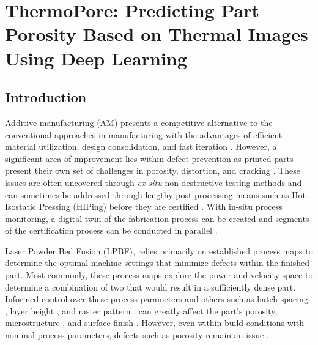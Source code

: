 \newcommand{\bftab}{\fontseries{bs}\selectfont}

\chapter{ThermoPore: Predicting Part Porosity Based on Thermal Images Using Deep Learning}
\label{chapter:thermopore}

\section{Introduction}
Additive manufacturing (AM) presents a competitive alternative to the
conventional approaches in manufacturing with the advantages of efficient
material utilization, design consolidation, and fast iteration \cite{
rahman_review_2023, beaman_additive_2020, akbari_meltpoolnet_2022,
hemmasian_surrogate_2023}. However, a significant area of improvement lies
within defect prevention as printed parts present their own set of challenges in
porosity, distortion, and cracking \cite{rahman_review_2023}. These issues are
often uncovered through \textit{ex-situ} non-destructive testing methods and can
sometimes be addressed through lengthy post-processing means such as Hot
Isostatic Pressing (HIPing) before they are certified
\cite{ordas_fabrication_2015, dolimont_effect_2016}. With in-situ process
monitoring, a digital twin of the fabrication process can be created and
segments of the certification process can be conducted in parallel
\cite{knapp_building_2017, bartsch_digital_2021, gaikwad_toward_2020}.

Laser Powder Bed Fusion (LPBF), relies primarily on established process maps
\cite{clymer_powervelocity_2017, agrawal_predictive_2022, grasso_-situ_2021} to
determine the optimal machine settings that minimize defects within the finished
part. Most commonly, these process maps explore the power and velocity space to
determine a combination of two that would result in a sufficiently dense part.
Informed control over these process parameters and others such as hatch spacing
\cite{xia_influence_2016}, layer height \cite{snyder_build_2015}, and raster
pattern \cite{mertens_optimization_2014}, can greatly affect the part's
porosity, microstructure \cite{gockel_understanding_2013}, and surface finish
\cite{snyder_build_2015}. However, even within build conditions with nominal
process parameters, defects such as porosity remain an issue
\cite{slotwinski_porosity_2014}.

